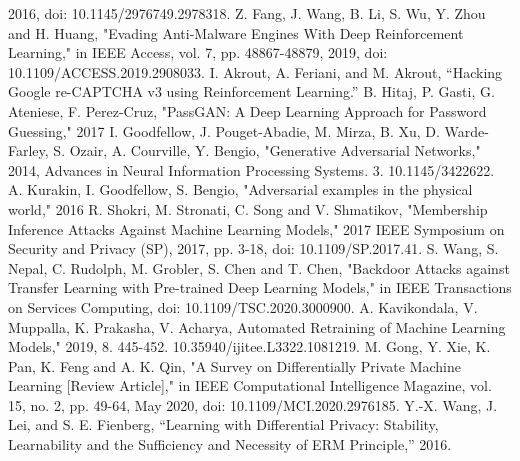 \documentclass[11pt,conference]{IEEEtran}
\begin{document}
\begin{thebibliography}{00}
        2016, doi: 10.1145/2976749.2978318.
     Z. Fang, J. Wang, B. Li, S. Wu, Y. Zhou and H. Huang,
        "Evading Anti-Malware Engines With Deep Reinforcement Learning," in
        IEEE Access, vol. 7, pp. 48867-48879, 2019, doi:
        10.1109/ACCESS.2019.2908033.
     I. Akrout, A. Feriani, and M. Akrout, “Hacking  Google
        re-CAPTCHA v3 using Reinforcement Learning.”
     B. Hitaj, P. Gasti, G. Ateniese, F. Perez-Cruz, "PassGAN: A Deep Learning Approach for
        Password Guessing," 2017
     I. Goodfellow, J. Pouget-Abadie, M. Mirza, B. Xu, D.
        Warde-Farley, S. Ozair, A. Courville, Y. Bengio, "Generative
        Adversarial Networks," 2014, Advances in Neural
        Information Processing Systems. 3. 10.1145/3422622. 
     A. Kurakin, I. Goodfellow, S. Bengio, "Adversarial examples
        in the physical world," 2016
     R. Shokri, M. Stronati, C. Song and V. Shmatikov, "Membership
        Inference Attacks Against Machine Learning Models," 2017 IEEE Symposium
        on Security and Privacy (SP), 2017, pp. 3-18, doi: 10.1109/SP.2017.41.
     S. Wang, S. Nepal, C. Rudolph, M. Grobler, S. Chen and T.
        Chen, "Backdoor Attacks against Transfer Learning with Pre-trained Deep
        Learning Models," in IEEE Transactions on Services Computing, doi:
        10.1109/TSC.2020.3000900.
     A. Kavikondala, V. Muppalla, K. Prakasha, V. Acharya, Automated Retraining of Machine
        Learning Models," 2019, 8. 445-452. 10.35940/ijitee.L3322.1081219. 
     M. Gong, Y. Xie, K. Pan, K. Feng and A. K. Qin, "A Survey on
        Differentially Private Machine Learning [Review Article]," in IEEE
        Computational Intelligence Magazine, vol. 15, no. 2, pp. 49-64, May
        2020, doi: 10.1109/MCI.2020.2976185.
     Y.-X. Wang, J. Lei, and S. E. Fienberg, “Learning with
        Differential Privacy: Stability, Learnability and the Sufficiency and
        Necessity of ERM Principle,” 2016.

\end{thebibliography}
\vspace{12pt}
\end{document}
